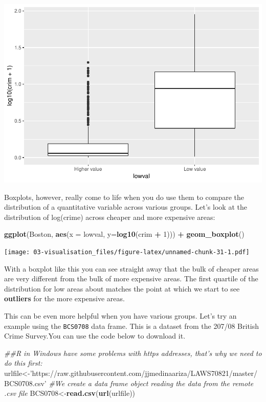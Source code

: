 \documentclass[]{book}
\newenvironment{Shaded}{\begin{snugshade}}{\end{snugshade}}
\newcommand{\CommentTok}[1]{\textcolor[rgb]{0.56,0.35,0.01}{\textit{#1}}}
\newcommand{\DataTypeTok}[1]{\textcolor[rgb]{0.13,0.29,0.53}{#1}}
\newcommand{\DecValTok}[1]{\textcolor[rgb]{0.00,0.00,0.81}{#1}}
\newcommand{\KeywordTok}[1]{\textcolor[rgb]{0.13,0.29,0.53}{\textbf{#1}}}
\newcommand{\NormalTok}[1]{#1}
\newcommand{\OperatorTok}[1]{\textcolor[rgb]{0.81,0.36,0.00}{\textbf{#1}}}
\newcommand{\StringTok}[1]{\textcolor[rgb]{0.31,0.60,0.02}{#1}}
\theoremstyle{definition}
\theoremstyle{definition}
\theoremstyle{definition}
\theoremstyle{remark}
\begin{document}
\includegraphics{03-visualisation_files/figure-latex/unnamed-chunk-30-1.pdf}

Boxplots, however, really come to life when you do use them to compare
the distribution of a quantitative variable across various groups. Let's
look at the distribution of log(crime) across cheaper and more expensive
areas:

\begin{Shaded}
\begin{Highlighting}[]
\KeywordTok{ggplot}\NormalTok{(Boston, }\KeywordTok{aes}\NormalTok{(}\DataTypeTok{x =}\NormalTok{ lowval, }\DataTypeTok{y=}\KeywordTok{log10}\NormalTok{(crim }\OperatorTok{+}\StringTok{ }\DecValTok{1}\NormalTok{))) }\OperatorTok{+}
\StringTok{  }\KeywordTok{geom_boxplot}\NormalTok{()}
\end{Highlighting}
\end{Shaded}

\texttt{[image: 03-visualisation\_files/figure-latex/unnamed-chunk-31-1.pdf]}

With a boxplot like this you can see straight away that the bulk of
cheaper areas are very different from the bulk of more expensive areas.
The first quartile of the distribution for low areas about matches the
point at which we start to see \textbf{outliers} for the more expensive
areas.

This can be even more helpful when you have various groups. Let's try an
example using the \texttt{BCS0708} data frame. This is a dataset from
the 207/08 British Crime Survey.You can use the code below to download
it.

\begin{Shaded}
\begin{Highlighting}[]
\CommentTok{##R in Windows have some problems with https addresses, that's why we need to do this first:}
\NormalTok{urlfile<-}\StringTok{'https://raw.githubusercontent.com/jjmedinaariza/LAWS70821/master/BCS0708.csv'}
\CommentTok{#We create a data frame object reading the data from the remote .csv file}
\NormalTok{BCS0708<-}\KeywordTok{read.csv}\NormalTok{(}\KeywordTok{url}\NormalTok{(urlfile))}
\end{Highlighting}
\end{Shaded}
\end{document}
